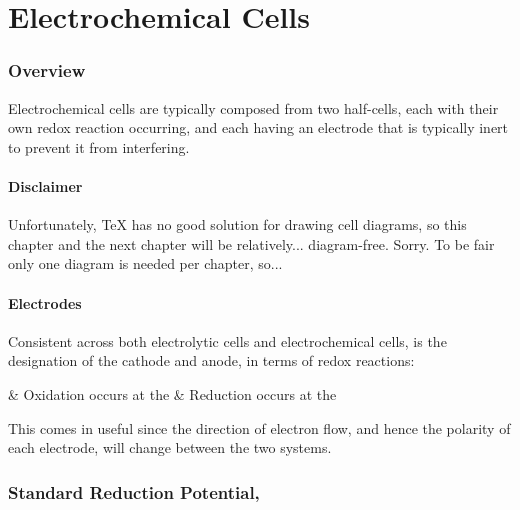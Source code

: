 

\pagebreak
\part{Electrochemical Cells}

	\section{Overview}

		Electrochemical cells are typically composed from two half-cells, each with their own redox reaction occurring, and each having an
		electrode that is typically inert to prevent it from interfering.

		\subsection{Disclaimer}

			Unfortunately, \TeX{} has no good solution for drawing cell diagrams, so this chapter and the next chapter will be relatively...
			diagram-free. Sorry. To be fair only one diagram is needed per chapter, so...



		\subsection{Electrodes}

			Consistent across both electrolytic cells and electrochemical cells, is the designation of the cathode and anode, in terms of
			redox reactions:

			\begin{bulletlist}
				& Oxidation occurs at the 
				& Reduction occurs at the 
			\end{bulletlist}

			This comes in useful since the direction of electron flow, and hence the polarity of each electrode, will change between the two
			systems.




	\pagebreak
	\section{Standard Reduction Potential, \texorpdfstring{\MEo{}}{Eo}}


